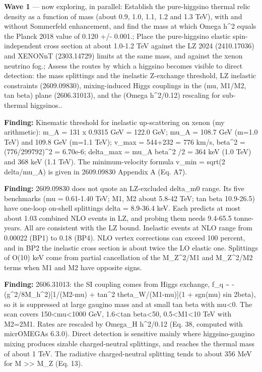 \documentclass[11pt,a4paper]{article}
\begin{document}
\textbf{Wave 1} --- now exploring, in parallel: Establish the pure-higgsino thermal relic density as a function of mass (about 0.9, 1.0, 1.1, 1.2 and 1.3 TeV), with and without Sommerfeld enhancement, and find the mass at which Omega h\textasciicircum{}2 equals the Planck 2018 value of 0.120 +/- 0.001.; Place the pure-higgsino elastic spin-independent cross section at about 1.0-1.2 TeV against the LZ 2024 (2410.17036) and XENONnT (2303.14729) limits at the same mass, and against the xenon neutrino fog.; Assess the routes by which a higgsino becomes visible to direct detection: the mass splittings and the inelastic Z-exchange threshold, LZ inelastic constraints (2609.09830), mixing-induced Higgs couplings in the (mu, M1/M2, tan beta) plane (2606.31013), and the (Omega h\textasciicircum{}2/0.12) rescaling for sub-thermal higgsinos..

\textbf{Finding:} Kinematic threshold for inelastic up-scattering on xenon (my arithmetic): m\_A = 131 x 0.9315 GeV = 122.0 GeV; mu\_A = 108.7 GeV (m=1.0 TeV) and 109.8 GeV (m=1.1 TeV); v\_max = 544+232 = 776 km/s, beta\textasciicircum{}2 = (776/299792)\textasciicircum{}2 = 6.70e-6; delta\_max = mu\_A beta\textasciicircum{}2 /2 = 364 keV (1.0 TeV) and 368 keV (1.1 TeV). The minimum-velocity formula v\_min = sqrt(2 delta/mu\_A) is given in 2609.09830 Appendix A (Eq. A7).

\textbf{Finding:} 2609.09830 does not quote an LZ-excluded delta\_m0 range. Its five benchmarks (\textbar{}mu\textbar{} = 0.61-1.40 TeV; \textbar{}M1\textbar{}, M2 about 5.8-42 TeV; tan beta 10.9-26.5) have one-loop on-shell splittings delta = 8.9-36.4 keV. Each predicts at most about 1.03 combined NLO events in LZ, and probing them needs 9.4-65.5 tonne-years. All are consistent with the LZ bound. Inelastic events at NLO range from 0.00022 (BP1) to 0.18 (BP4). NLO vertex corrections can exceed 100 percent, and in BP2 the inelastic cross section is about twice the LO elastic one. Splittings of O(10) keV come from partial cancellation of the M\_Z\textasciicircum{}2/M1 and M\_Z\textasciicircum{}2/M2 terms when M1 and M2 have opposite signs.

\textbf{Finding:} 2606.31013: the SI coupling comes from Higgs exchange, f\_q \textasciitilde{} -(g\textasciicircum{}2/8M\_h\textasciicircum{}2)[1/(M2-\textbar{}mu\textbar{}) + tan\textasciicircum{}2 theta\_W/(M1-\textbar{}mu\textbar{})](1 + sgn(mu) sin 2beta), so it is suppressed at large gaugino mass and at small tan beta with mu\textless{}0. The scan covers 150\textless{}\textbar{}mu\textbar{}\textless{}1000 GeV, 1.6\textless{}tan beta\textless{}50, 0.5\textless{}M1\textless{}10 TeV with M2=2M1. Rates are rescaled by Omega\_H h\textasciicircum{}2/0.12 (Eq. 38, computed with micrOMEGAs 6.3.0). Direct detection is sensitive mainly where higgsino-gaugino mixing produces sizable charged-neutral splittings, and reaches the thermal mass of about 1 TeV. The radiative charged-neutral splitting tends to about 356 MeV for M \textgreater{}\textgreater{} M\_Z (Eq. 13).
\end{document}

